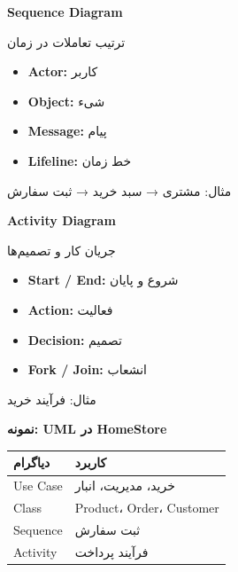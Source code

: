 \documentclass[14pt, a4paper, landscape]{extarticle}
\newcommand{\slide}[1]{%
    \newpage
    \begin{center}
    \begin{minipage}[t]{0.95\textwidth}
    \vspace{0.5cm}
    #1
    \vspace{0.5cm}
    \end{minipage}
    \end{center}
}
\newcommand{\slidetitle}[1]{%
    \begin{center}
        {\LARGE\bfseries\textcolor{primary}{#1}}
    \end{center}
    \vspace{0.5cm}
}
\newcommand{\myaccent}[1]{\textcolor{accent}{#1}}
\begin{document}
\slide{
    \slidetitle{Sequence Diagram}
    \vspace{0.5cm}
    {\large ترتیب تعاملات در زمان}
    \vspace{1cm}
    \begin{itemize}[itemsep=0.5em]
        \item \textbf{Actor:} کاربر
        \item \textbf{Object:} شیء
        \item \textbf{Message:} پیام
        \item \textbf{Lifeline:} خط زمان
    \end{itemize}
    \vspace{0.5cm}
    \begin{center}
        {\myaccent{مثال: مشتری → سبد خرید → ثبت سفارش}}
    \end{center}
}

\slide{
    \slidetitle{Activity Diagram}
    \vspace{0.5cm}
    {\large جریان کار و تصمیم‌ها}
    \vspace{1cm}
    \begin{itemize}[itemsep=0.5em]
        \item \textbf{Start / End:} شروع و پایان
        \item \textbf{Action:} فعالیت
        \item \textbf{Decision:} تصمیم
        \item \textbf{Fork / Join:} انشعاب
    \end{itemize}
    \vspace{0.5cm}
    \begin{center}
        {\myaccent{مثال: فرآیند خرید}}
    \end{center}
}

\slide{
    \slidetitle{نمونه: UML در HomeStore}
    \vspace{0.5cm}
    \begin{center}
        \begin{tabular}{ll}
            \toprule
            \textbf{دیاگرام} & \textbf{کاربرد} \\
            \midrule
            Use Case & خرید، مدیریت، انبار \\
            \hline
            Class & Product، Order، Customer \\
            \hline
            Sequence & ثبت سفارش \\
            \hline
            Activity & فرآیند پرداخت \\
            \bottomrule
        \end{tabular}
    \end{center}
}
\end{document}
